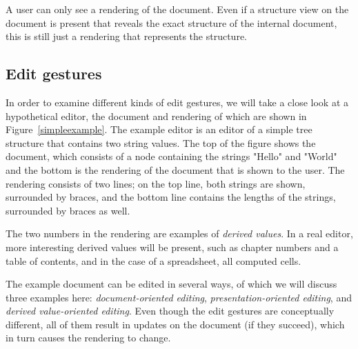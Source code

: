 A user can only see a rendering of the document. Even if a structure view on the document is present that reveals the exact structure of the internal document, this is still just a rendering that represents the structure.
\subsection{Edit gestures}

\begin{figure}
\end{figure}


In order to examine different kinds of edit gestures, we will take a close look at a hypothetical editor, the document and rendering of which are shown in Figure~\ref{simpleexample}. The example editor is an editor of a simple tree structure that contains two string values. The top of the figure shows the document, which consists of a node containing the strings "Hello" and "World" and the bottom is the rendering of the document that is shown to the user. The rendering consists of two lines; on the top line, both strings are shown, surrounded by braces, and the bottom line contains the lengths of the strings, surrounded by braces as well. 

The two numbers in the rendering are examples of {\em derived values}. In a real editor, more interesting derived values will be present, such as chapter numbers and a table of contents, and in the case of a spreadsheet, all computed cells.

The example document can be edited in several ways, of which we will discuss three examples here: {\em document-oriented editing}, {\em presentation-oriented editing}, and {\em derived value-oriented editing}. Even though the edit gestures are conceptually different, all of them result in updates on the document (if they succeed), which in turn causes the rendering to change.

